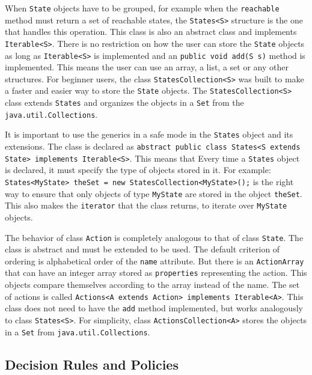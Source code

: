 \documentclass[11pt]{article}
\begin{document}
When \lstinline!State! objects have to be grouped, for example when the \lstinline!reachable! method must return a set of reachable states, the \lstinline!States<S>! structure is the one that handles this operation. This class is also an abstract class and implements \lstinline!Iterable<S>!. There is no restriction on how the user can store the \lstinline!State! objects as long as \lstinline!Iterable<S>! is implemented and an \lstinline!public void add(S s)! method is implemented. This means the user can use an array, a list, a set or any other structures. For beginner users, the class \lstinline!StatesCollection<S>! was built to make a faster and easier way to store the \lstinline!State! objects. The \lstinline!StatesCollection<S>! class extends \lstinline!States! and organizes the objects in a \lstinline!Set! from the \lstinline!java.util.Collections!.

It is important to use the generics in a safe mode in the \lstinline!States! object and its extensions. The class is declared as \lstinline!abstract public class States<S extends State> implements Iterable<S>!. This means that Every time a \lstinline!States! object is declared, it must specify the type of objects stored in it. For example: \lstinline!States<MyState> theSet = new StatesCollection<MyState>();! is the right way to ensure that only objects of type \lstinline!MyState! are stored in the object \lstinline!theSet!. This also makes the \lstinline!iterator! that the class returns, to iterate over \lstinline!MyState! objects.

The behavior of class \lstinline!Action! is completely analogous to that of class \lstinline!State!. The class is abstract and must be extended to be used. The default criterion of ordering is alphabetical order of the \lstinline!name! attribute. But there is an \lstinline!ActionArray! that can have an integer array stored as \lstinline!properties! representing the action. This objects compare themselves according to the array instead of the name. The set of actions is called \lstinline!Actions<A extends Action> implements Iterable<A>!. This class does not need to have the \lstinline!add! method implemented, but works analogously to class \lstinline!States<S>!. For simplicity, class \lstinline!ActionsCollection<A>! stores the objects in a \lstinline!Set! from \lstinline!java.util.Collections!.

\subsection{Decision Rules and Policies}
\end{document}
